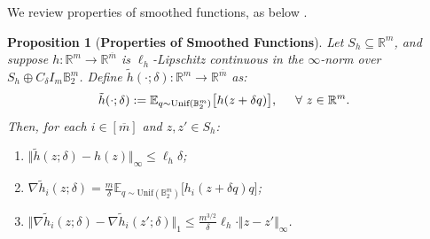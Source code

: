 \documentclass[letterpaper, 10 pt, conference]{ieeeconf}
\newcommand{\E}{\mathbb{E}}
\newcommand{\ra}{\rightarrow}
\newcommand{\R}{\mathbb{R}}
\newcommand{\?}{\stackrel{?}{=}}
\newcommand{\ballUnit}{\mathbb{B}}
\newcommand{\samplingRadius}{\delta}
\newcommand{\samplingRadiusMax}{C_\samplingRadius}
\newcommand{\samplingVariable}{q}
\newcommand{\exampleFunction}{h}
\newcommand{\exampleFunctionSmoothed}{\tilde{\exampleFunction}}
\newcommand{\varExample}{z}
\newcommand{\exampleInputDim}{m}
\newcommand{\exampleOutputDim}{{\overline{m}}}
\newcommand{\lipschitz}{\ell}
\newcommand{\exampleConstraintSet}{S_\exampleFunction}
\newcommand{\unif}{\text{Unif}}
\newtheorem{proposition}{Proposition}
\newcommand{\frank}[1]{{\textcolor[rgb]{0,0,1}{\textsf{[Frank: {#1}]}}}}
\newcommand{\antoine}[1]{{\textcolor[rgb]{1,0,0}{\textsf{[Antoine: {#1}]}}}}
\begin{document}
We review properties of smoothed functions, as below \cite{Flaxman2005OnlineConvexOptimization}.

\begin{proposition}[\textbf{Properties of Smoothed Functions}]
\label{Prop: Properties of Smoothed Functions}
Let $\exampleConstraintSet \subseteq \R^\exampleInputDim$, and suppose $\exampleFunction: \R^\exampleInputDim \ra \R^\exampleOutputDim$ is $\lipschitz_\exampleFunction$-Lipschitz continuous in the $\infty$-norm over $\exampleConstraintSet \oplus \samplingRadiusMax I_\exampleInputDim \ballUnit_2^\exampleInputDim$. Define $\exampleFunctionSmoothed(\cdot; \samplingRadius): \R^\exampleInputDim \ra \R^\exampleOutputDim$ as:
{
\setlength{\abovedisplayskip}{3.5pt}
\setlength{\belowdisplayskip}{3.5pt}
\begin{align}
    \exampleFunctionSmoothed(\cdot; \samplingRadius) &:= \E_{\samplingVariable \sim \unif(\ballUnit_2^\exampleInputDim)} \big[ \exampleFunction(\varExample + \samplingRadius \samplingVariable) \big], \hspace{5mm} \forall \ \varExample \in \R^\exampleInputDim.
\end{align}
}
\hspace{-1mm}Then, for each $i \in [\exampleOutputDim]$ and $\varExample, \varExample' \in \exampleConstraintSet$:
\begin{enumerate}
    \item $\Vert \exampleFunctionSmoothed(\varExample; \samplingRadius) - \exampleFunction(\varExample) \Vert_\infty \leq \lipschitz_\exampleFunction \samplingRadius$;
    \item $\nabla \exampleFunctionSmoothed_i(\varExample; \samplingRadius) = \frac{\exampleInputDim}{\samplingRadius} \E_{\samplingVariable \sim \unif(\ballUnit_2^\exampleInputDim)} \big[ \exampleFunction_i (\varExample + \samplingRadius \samplingVariable) \samplingVariable \big]$;
    \item $\Vert \nabla \exampleFunctionSmoothed_i(\varExample; \samplingRadius) - \nabla \exampleFunctionSmoothed_i(\varExample'; \samplingRadius) \Vert_1 \leq \frac{\exampleInputDim^{3/2}}{\samplingRadius} \lipschitz_\exampleFunction \cdot \Vert \varExample - \varExample' \Vert_\infty$.
\end{enumerate}
\end{proposition}
\end{document}
